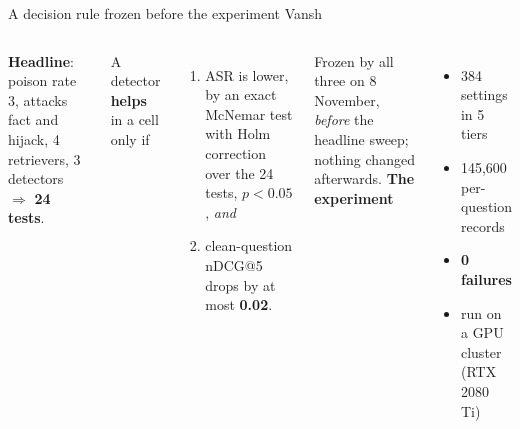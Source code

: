 \documentclass[aspectratio=169,11pt]{beamer}
\newcommand{\who}[1]{\hfill{\normalsize\color{muted}\textmd{#1}}}
\newcommand{\ok}[1]{{\color{good}\textbf{#1}}}
\begin{document}
\begin{frame}[t]{A decision rule frozen before the experiment \who{Vansh}}
\begin{columns}[T]
\textbf{Headline}: poison rate 3, attacks fact and hijack, 4 retrievers, 3 detectors $\Rightarrow$ \textbf{24 tests}.
\vspace{0.1cm}

A detector \textbf{helps} in a cell only if
\begin{enumerate}
\item ASR is lower, by an exact McNemar test with Holm correction over the 24 tests, $p < 0.05$, \emph{and}
\item clean-question nDCG@5 drops by at most \textbf{0.02}.
\end{enumerate}
Frozen by all three on 8 November, \emph{before} the headline sweep; nothing changed afterwards.
\textbf{The experiment}
\begin{itemize}
\item 384 settings in 5 tiers
\item 145,600 per-question records
\item \ok{0 failures}
\item run on a GPU cluster (RTX 2080 Ti)
\end{itemize}
\end{columns}
\end{frame}
\end{document}
